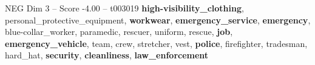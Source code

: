 \begin{textsample}{NEG Dim 3 – Score -4.00 – t003019}  \label{ex:f3_neg_034}
\textbf{high-visibility\_clothing}, personal\_protective\_equipment, \textbf{workwear}, \textbf{emergency\_service}, \textbf{emergency}, blue-collar\_worker, paramedic, rescuer, uniform, rescue, \textbf{job}, \textbf{emergency\_vehicle}, team, crew, stretcher, vest, \textbf{police}, firefighter, tradesman, hard\_hat, \textbf{security}, \textbf{cleanliness}, \textbf{law\_enforcement}

\end{textsample}
